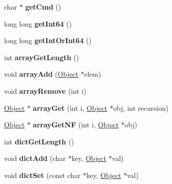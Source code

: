 \begin{DoxyCompactItemize}
char $\ast$ {\bfseries get\+Cmd} ()
\item 
\mbox{\label{class_object_a472124cc44c8f5ba7cd1cf8b612ae56e}} 
long long {\bfseries get\+Int64} ()
\item 
\mbox{\label{class_object_a145eee906c4c81ca6af8b3485ba201f3}} 
long long {\bfseries get\+Int\+Or\+Int64} ()
\item 
\mbox{\label{class_object_aa6374f9a3075f069dbab0b16cbd3262c}} 
int {\bfseries array\+Get\+Length} ()
\item 
\mbox{\label{class_object_a7b9b5a79e6dc5e88e3eea1fbeddbebd8}} 
void {\bfseries array\+Add} (\hyperlink{class_object}{Object} $\ast$elem)
\item 
\mbox{\label{class_object_a7b1ea13698d3351ddfb5b792744347da}} 
void {\bfseries array\+Remove} (int i)
\item 
\mbox{\label{class_object_a3622a6457b912d7f71e3a9a4d4b6a6a2}} 
\hyperlink{class_object}{Object} $\ast$ {\bfseries array\+Get} (int i, \hyperlink{class_object}{Object} $\ast$obj, int recursion)
\item 
\mbox{\label{class_object_a59032f6e1f7c1187d3d5c21b851956bc}} 
\hyperlink{class_object}{Object} $\ast$ {\bfseries array\+Get\+NF} (int i, \hyperlink{class_object}{Object} $\ast$obj)
\item 
\mbox{\label{class_object_a8369b86ddebfd717e655d0e6f9ded28b}} 
int {\bfseries dict\+Get\+Length} ()
\item 
\mbox{\label{class_object_a8e22d8e942682ed9ecf76a1bf745f673}} 
void {\bfseries dict\+Add} (char $\ast$key, \hyperlink{class_object}{Object} $\ast$val)
\item 
\mbox{\label{class_object_a954bbe317716dd6c5549c727fd428c72}} 
void {\bfseries dict\+Set} (const char $\ast$key, \hyperlink{class_object}{Object} $\ast$val)
\item 
\mbox{\label{class_object_a26552d69e8baa79c438a51c90351b595}} 

\end{DoxyCompactItemize}
